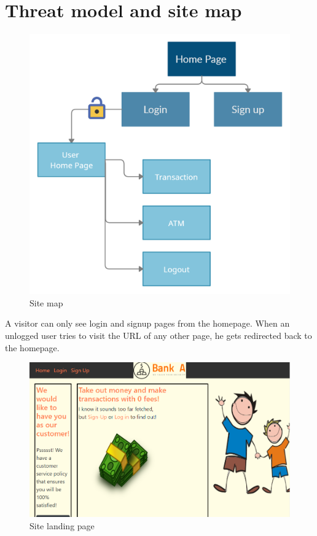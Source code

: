 \renewcommand{\chaptername}{Chapter}
\chapter{Threat model and site map}\label{kap:Threat model and site map}
\renewcommand{\figurename}{Fig.}

\begin{figure}[H]
    \centering
    \includegraphics[width=\textwidth]{pics/pic1 Site map.png}
    \caption{Site map}
    \label{fig:cha1fig1sitemap}
\end{figure}

A visitor can only see login and signup pages from the homepage. When an unlogged user tries to visit the URL of any other page, he gets redirected back to the homepage.

\begin{figure}[H]
    \centering
    \includegraphics[width=\textwidth]{pics/pic2 home visitor.PNG}
    \caption{Site landing page}
    \label{fig:cha1fig2landingpage}
\end{figure}

